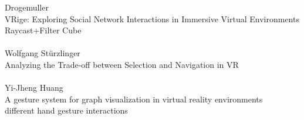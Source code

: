Drogemuller\\
VRige: Exploring Social Network Interactions in Immersive Virtual Environments\\
Raycast+Filter Cube\\
\\
Wolfgang Stürzlinger\\
Analyzing the Trade-off between Selection and Navigation in VR\\
\\
Yi-Jheng Huang\\
A gesture system for graph visualization in virtual reality environments\\
different hand gesture interactions\\
\\

